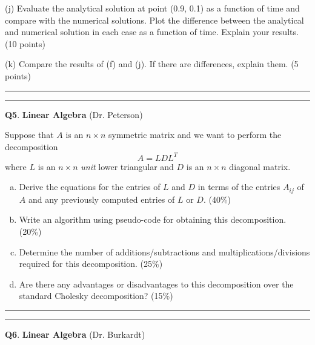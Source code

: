 \documentclass[11pt,letterpaper]{article}
\newcommand{\highlight}[1]{\textcolor{BrickRed}{#1}}
\begin{document}
\medskip
(j) Evaluate the analytical solution at point (0.9, 0.1) as a function of time and compare with the numerical solutions. Plot the difference between the analytical and numerical solution in each case as a function of time. Explain your results. (10 points)    

\medskip
(k) Compare the results of (f) and (j). If there are differences, explain them. (5 points)    

\bigskip
\hrule \medskip


\pagebreak
\hrule 
\medskip
\textbf{Q5}. \highlight{\textbf{Linear Algebra}} (Dr. Peterson)
\label{q5}
\bigskip

Suppose that $A$ is an $n \times n$ symmetric  matrix and we want to perform the decomposition
$$A=L D L^T$$
where $L$ is an $n \times n$ {\it unit}\/  lower triangular and $D$ is an $n \times n$ diagonal matrix.

\smallskip

\begin{enumerate}[a)]
\item Derive the equations for the entries of $L$ and $D$ in terms of the entries $A_{ij}$ of $A$  and any previously computed entries of $L$ or $D$. (40\%)  

\item Write an algorithm using pseudo-code  for obtaining this decomposition. (20\%) 

\item Determine the number of additions/subtractions and multiplications/divisions  required for this decomposition. (25\%)  

\item Are there any advantages or disadvantages to this decomposition over the standard Cholesky decomposition? (15\%)   

\end{enumerate}

\bigskip
\hrule \medskip

\pagebreak

\pagebreak
\hrule 
\medskip
\textbf{Q6}. \highlight{\textbf{Linear Algebra}} (Dr. Burkardt)
\label{q6}
\bigskip
\end{document}
